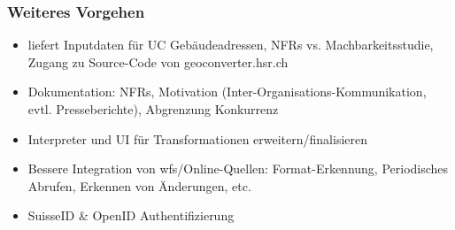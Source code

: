 \documentclass[class=scrbook,crop=false]{standalone}
\begin{document}
	\subsubsection*{Weiteres Vorgehen}
	\begin{itemize}
		\item \prof liefert Inputdaten für UC Gebäudeadressen, NFRs vs. Machbarkeitsstudie, Zugang zu Source-Code von geoconverter.hsr.ch
		\item Dokumentation: NFRs, Motivation (Inter-Organisations-Kommunikation, evtl. Presseberichte), Abgrenzung Konkurrenz
		\item Interpreter und UI für Transformationen erweitern/finalisieren
		\item Bessere Integration von \acs{wfs}/Online-Quellen: Format-Erkennung, Periodisches Abrufen, Erkennen von Änderungen, etc.
		\item SuisseID \& OpenID Authentifizierung
	\end{itemize}
\end{document}
